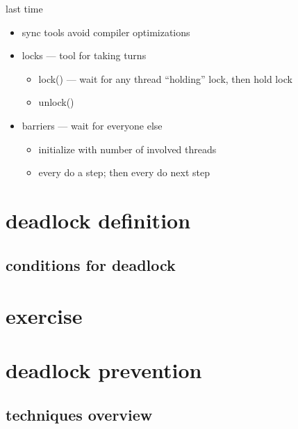 \documentclass[aspectratio=169]{mytalk}
\title{}
\date{}
\begin{document}


\begin{frame}{last time}
    \begin{itemize}
    \item sync tools avoid compiler optimizations
    \item locks --- tool for taking turns
        \begin{itemize}
        \item lock() --- wait for any thread ``holding'' lock, then hold lock
        \item unlock()
        \end{itemize}
    \item barriers --- wait for everyone else
        \begin{itemize}
        \item initialize with number of involved threads
        \item every do a step; then every do next step
        \end{itemize}
    \end{itemize}
\end{frame}

\section{deadlock definition}


\subsection{conditions for deadlock}



\section{exercise}



\section{deadlock prevention}

\subsection{techniques overview}


\end{document}

